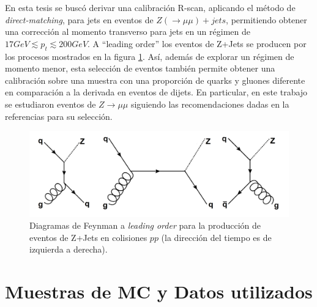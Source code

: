 En esta tesis se buscó derivar una calibración R-scan, aplicando el método de \textit{direct-matching}, para jets en eventos de $Z(\rightarrow\mu\mu)+jets$, permitiendo obtener una corrección al momento transverso para jets en un régimen de $17GeV\lesssim p_t \lesssim200GeV$. A ``leading order'' los eventos de Z+Jets se producen por los procesos mostrados en la figura \ref{fig:diagramas}. Así, además de explorar un régimen de momento menor, esta selección de eventos también permite obtener una calibración sobre una muestra con una proporción de quarks y gluones diferente en comparación a la derivada en eventos de dijets. En particular, en este trabajo se estudiaron eventos de $Z\rightarrow \mu\mu$ siguiendo las recomendaciones dadas en la referencias \cite{ZmumuTwiki}\cite{Rebecca} para su selección. 

\begin{figure}[h]
    \centering
    \includegraphics[width =0.7\linewidth]{images/diagramas}
    \caption{ Diagramas de Feynman a \textit{leading order} para la producción de eventos de Z+Jets en colisiones $pp$ (la dirección del tiempo es de izquierda a derecha).}
    \label{fig:diagramas}
\end{figure}



\section{Muestras de MC y Datos utilizados}\label{Muestras}

